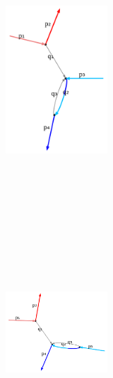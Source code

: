 \documentclass[
  11pt,
  a4paper,
  DIV=11,
  numbers=noendperiod,
  twoside]{scrreprt}
\DeclareRobustCommand{\[}{\begin{equation}}
\DeclareRobustCommand{\]}{\end{equation}}
\begin{document}
\begin{figure}
\begin{minipage}[t]{0.25\linewidth}
{\begin{figure}[H]
{}

\end{figure}

}

\end{minipage}%
\newline
\begin{minipage}[t]{0.25\linewidth}

{\centering 

\begin{figure}[H]

{\centering \includegraphics[width=1.5in,height=3.5in]{./scattering_files/figure-latex/dot-figure-14.png}

}

\end{figure}

}

\end{minipage}%
%
\begin{minipage}[t]{0.25\linewidth}

{\centering 

\begin{figure}[H]

{\centering \includegraphics[width=1.5in,height=3.5in]{./scattering_files/figure-latex/dot-figure-13.png}

}
\end{figure}}
\end{minipage}
\end{figure}
\end{document}
